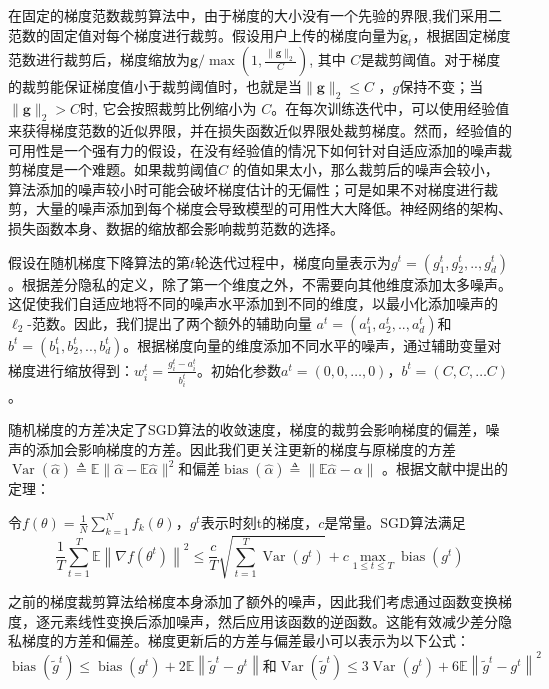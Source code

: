 在固定的梯度范数裁剪算法中，由于梯度的大小没有一个先验的界限,我们采用二范数的固定值对每个梯度进行裁剪。假设用户上传的梯度向量为$\tilde{\mathbf{g}}_{t}$，根据固定梯度范数进行裁剪后，梯度缩放为$\mathbf{g} / \max \left(1, \frac{\|\mathbf{g}\|_{2}}{C}\right)$, 其中 $C$是裁剪阈值。对于梯度的裁剪能保证梯度值小于裁剪阈值时，也就是当$\|\mathbf{g}\|_{2} \leq C$ ，$g$保持不变；当$\|\mathbf{g}\|_{2}>C$时, 它会按照裁剪比例缩小为 $C$。在每次训练迭代中，可以使用经验值来获得梯度范数的近似界限，并在损失函数近似界限处裁剪梯度。然而，经验值的可用性是一个强有力的假设，在没有经验值的情况下如何针对自适应添加的噪声裁剪梯度是一个难题。如果裁剪阈值$C$ 的值如果太小，那么裁剪后的噪声会较小，算法添加的噪声较小时可能会破坏梯度估计的无偏性；可是如果不对梯度进行裁剪，大量的噪声添加到每个梯度会导致模型的可用性大大降低。神经网络的架构、损失函数本身、数据的缩放都会影响裁剪范数的选择。

假设在随机梯度下降算法的第$t$轮迭代过程中，梯度向量表示为$g^{t}=\left(g_{1}^{t}, g_{2}^{t}, . ., g_{d}^{t}\right)$。根据差分隐私的定义，除了第一个维度之外，不需要向其他维度添加太多噪声。这促使我们自适应地将不同的噪声水平添加到不同的维度，以最小化添加噪声的 $\ell_{2}$-范数。因此，我们提出了两个额外的辅助向量 $a^{t}=\left(a_{1}^{t}, a_{2}^{t}, . ., a_{d}^{t}\right)$和$b^{t}=\left(b_{1}^{t}, b_{2}^{t}, . ., b_{d}^{t}\right)$。根据梯度向量的维度添加不同水平的噪声，通过辅助变量对梯度进行缩放得到：$w_{i}^{t}=\frac{g_{i}^{t}-a_{i}^{t}}{b_{i}^{t}}$。初始化参数$a^{t}=(0,0, \ldots, 0)$，$b^{t}=(C, C, \ldots C)$。

随机梯度的方差决定了SGD算法的收敛速度，梯度的裁剪会影响梯度的偏差，噪声的添加会影响梯度的方差。因此我们更关注更新的梯度与原梯度的方差$\operatorname{Var}(\hat{\alpha}) \triangleq \mathbb{E}\|\hat{\alpha}-\mathbb{E} \hat{\alpha}\|^{2}$和偏差$\operatorname{bias}(\hat{\alpha}) \triangleq\|\mathbb{E} \hat{\alpha}-\alpha\|$ 。根据文献中提出的定理：
\begin{theorem}
令$f(\theta)=\frac{1}{N} \sum_{k=1}^{N} f_{k}(\theta)$，$g^{t}$表示时刻t的梯度，$c$是常量。SGD算法满足
$${}
\frac{1}{T} \sum_{t=1}^{T} \mathbb{E}\left\|\nabla f\left(\theta^{t}\right)\right\|^{2} \leq \frac{c}{T} \sqrt{\sum_{t=1}^{T} \operatorname{Var}\left(g^{t}\right)}+c \max _{1 \leq t \leq T} \operatorname{bias}\left(g^{t}\right)
$${}
\end{theorem}
之前的梯度裁剪算法给梯度本身添加了额外的噪声，因此我们考虑通过函数变换梯度，逐元素线性变换后添加噪声，然后应用该函数的逆函数。这能有效减少差分隐私梯度的方差和偏差。梯度更新后的方差与偏差最小可以表示为以下公式：
\begin{equation}\label{eq:梯度更新后的方差与偏差}
\operatorname{bias}\left(\tilde{g}^{t}\right) \leq \operatorname{bias}\left(g^{t}\right)+2 \mathbb{E}\left\|\tilde{g}^{t}-g^{t}\right\| \text {和} \operatorname{Var}\left(\tilde{g}^{t}\right) \leq 3 \operatorname{Var}\left(g^{t}\right)+6 \mathbb{E}\left\|\tilde{g}^{t}-g^{t}\right\|^{2}
\end{equation}

